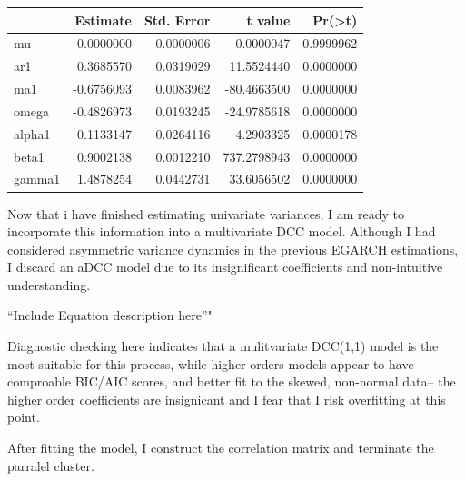 \documentclass[]{elsarticle} %
\begin{document}
\begin{longtable}[c]{@{}lrrrr@{}}
\toprule
& Estimate & Std. Error & t value &
Pr(\textgreater{}\textbar{}t\textbar{})\tabularnewline
\midrule
\endhead
mu & 0.0000000 & 0.0000006 & 0.0000047 & 0.9999962\tabularnewline
ar1 & 0.3685570 & 0.0319029 & 11.5524440 & 0.0000000\tabularnewline
ma1 & -0.6756093 & 0.0083962 & -80.4663500 & 0.0000000\tabularnewline
omega & -0.4826973 & 0.0193245 & -24.9785618 & 0.0000000\tabularnewline
alpha1 & 0.1133147 & 0.0264116 & 4.2903325 & 0.0000178\tabularnewline
beta1 & 0.9002138 & 0.0012210 & 737.2798943 & 0.0000000\tabularnewline
gamma1 & 1.4878254 & 0.0442731 & 33.6056502 & 0.0000000\tabularnewline
\bottomrule
\end{longtable}

Now that i have finished estimating univariate variances, I am ready to
incorporate this information into a multivariate DCC model. Although I
had considered asymmetric variance dynamics in the previous EGARCH
estimations, I discard an aDCC model due to its insignificant
coefficients and non-intuitive understanding.

``Include Equation description here''"

Diagnostic checking here indicates that a mulitvariate DCC(1,1) model is
the most suitable for this process, while higher orders models appear to
have comproable BIC/AIC scores, and better fit to the skewed, non-normal
data-- the higher order coefficients are insignicant and I fear that I
risk overfitting at this point.

After fitting the model, I construct the correlation matrix and
terminate the parralel cluster.
\end{document}
